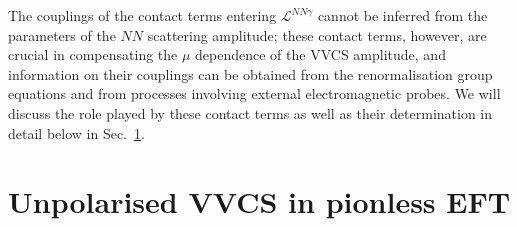 \documentclass[prl,
twocolumn,
showpacs,preprintnumbers,amsmath,amssymb,
superscriptaddress,
a4paper,nofootinbib,longbibliography]{revtex4-2}
\begin{document}
The couplings of the contact terms entering $\mathcal{L}^{NN\gamma}$ cannot be inferred from the parameters of the $NN$ scattering amplitude; these contact terms, however, are crucial in compensating the $\mu$ dependence of the VVCS amplitude, and information on their couplings can be obtained from the renormalisation group equations and from processes involving external electromagnetic probes. We will discuss the role played by these contact terms as well as their determination in detail below in Sec.~\ref{sec:VVCS_results}.


\section{Unpolarised VVCS in pionless EFT}
\label{sec:VVCS_results}
\end{document}
